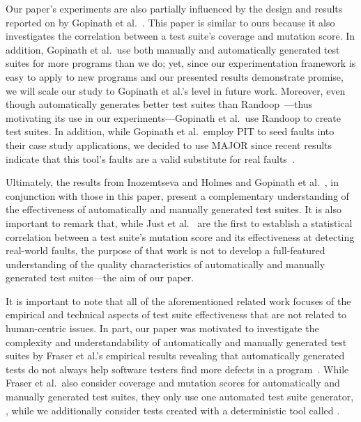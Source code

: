 Our paper's experiments are also partially influenced by the design and results reported on by Gopinath et al.~\cite{gopinath2014}.  This paper is similar to ours because it also investigates the correlation between a test suite's coverage and mutation score.  In addition, Gopinath et al.\ use both manually and automatically generated test suites for more programs than we do; yet, since our experimentation framework is easy to apply to new programs and our presented results demonstrate promise, we will scale our study to Gopinath et al.'s level in future work. Moreover, even though \evo automatically generates better test suites than Randoop~\cite{fraser2013a}---thus motivating its use in our experiments---Gopinath et al.\ use Randoop to create test suites.  In addition, while Gopinath et al.\ employ PIT to seed faults into their case study applications, we decided to use MAJOR since recent results indicate that this tool's faults are a valid substitute for real faults~\cite{just2014}. 

Ultimately, the results from Inozemtseva and Holmes \cite{inozemtseva2014} and Gopinath et al.~\cite{gopinath2014}, in conjunction with those in this paper, present a complementary understanding of the effectiveness of automatically and manually generated test suites. It is also important to remark that, while Just et al.~\cite{just2014} are the first to establish a statistical correlation between a test suite's mutation score and its effectiveness at detecting real-world faults, the purpose of that work is not to develop a full-featured understanding of the quality characteristics of automatically and manually generated test suites---the aim of our paper.


It is important to note that all of the aforementioned related work focuses of the empirical and technical aspects of test suite effectiveness that are not related to human-centric issues.  In part, our paper was motivated to investigate the complexity and understandability of automatically and manually generated test suites by Fraser et al.'s empirical results revealing that automatically generated tests do not always help software testers find more defects in a program~\cite{fraser2013c}.  While Fraser et al.\ also consider coverage and mutation scores for automatically and manually generated test suites, they only use one automated test suite generator, \evo, while we additionally consider tests created with a deterministic tool called \codepro.

